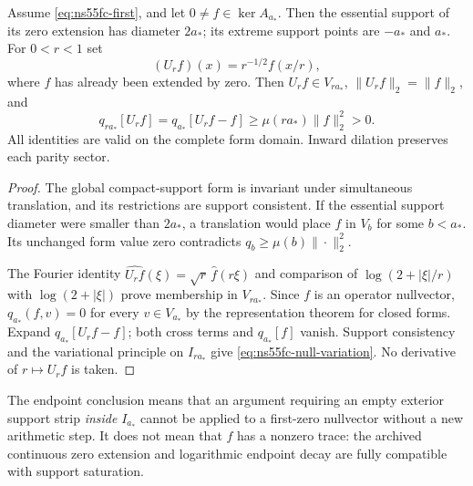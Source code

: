 \begin{proposition}
\label{prop:ns55fc-geometry}
Assume \eqref{eq:ns55fc-first}, and let $0\ne f\in\ker A_{a_*}$.
Then the essential support of its zero extension has diameter $2a_*$;
its extreme support points are $-a_*$ and $a_*$. For $0<r<1$ set
\[
 (U_rf)(x)=r^{-1/2}f(x/r),
\]
where $f$ has already been extended by zero. Then $U_rf\in V_{ra_*}$,
$\|U_rf\|_2=\|f\|_2$, and
\begin{equation}\label{eq:ns55fc-null-variation}
 q_{ra_*}[U_rf]
 =q_{a_*}[U_rf-f]
 \ge\mu(ra_*)\|f\|_2^2>0.
\end{equation}
All identities are valid on the complete form domain. Inward dilation
preserves each parity sector.
\end{proposition}
\begin{proof}
The global compact-support form is invariant under simultaneous
translation, and its restrictions are support consistent. If the
essential support diameter were smaller than $2a_*$, a translation
would place $f$ in $V_b$ for some $b<a_*$. Its unchanged form value
zero contradicts $q_b\ge\mu(b)\|\cdot\|_2^2$.

The Fourier identity $\widehat{U_rf}(\xi)=\sqrt r\,\widehat f(r\xi)$
and comparison of $\log(2+|\xi|/r)$ with $\log(2+|\xi|)$ prove
membership in $V_{ra_*}$. Since $f$ is an operator nullvector,
$q_{a_*}(f,v)=0$ for every $v\in V_{a_*}$ by the representation
theorem for closed forms. Expand $q_{a_*}[U_rf-f]$; both cross terms
and $q_{a_*}[f]$ vanish. Support consistency and the variational
principle on $I_{ra_*}$ give \eqref{eq:ns55fc-null-variation}.
No derivative of $r\mapsto U_rf$ is taken.
\end{proof}

The endpoint conclusion means that an argument requiring an empty
exterior support strip \emph{inside} $I_{a_*}$ cannot be applied to
a first-zero nullvector without a new arithmetic step. It does not
mean that $f$ has a nonzero trace: the archived continuous zero
extension and logarithmic endpoint decay are fully compatible with
support saturation.

